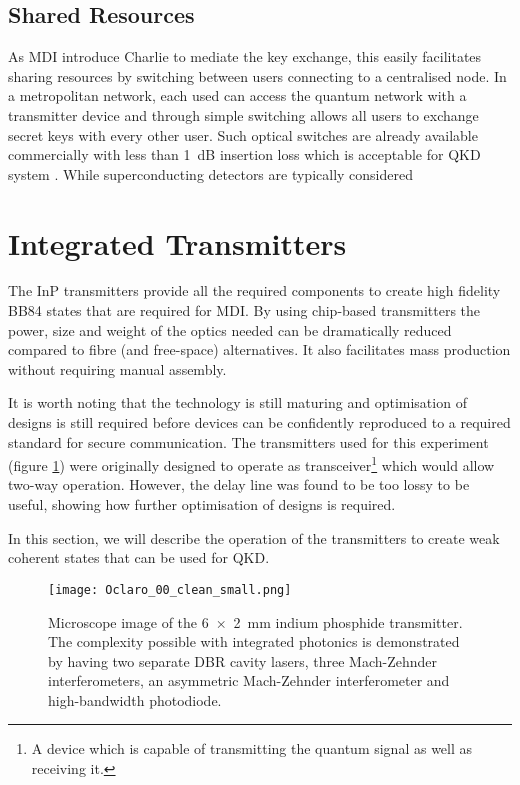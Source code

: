 \subsection{Shared Resources}

As \ac{MDI} introduce Charlie to mediate the key exchange, this easily facilitates sharing resources by switching between users connecting to a centralised node. In a metropolitan network, each used can access the quantum network with a transmitter device and through simple switching allows all users to exchange secret keys with every other user. Such optical switches are already available commercially with less than \SI{1}{dB} insertion loss which is acceptable for \ac{QKD} system \cite{polatis}. While superconducting detectors are typically considered 

\section{Integrated Transmitters}

The \ac{InP} transmitters provide all the required components to create high fidelity BB84 states that are required for \ac{MDI}. By using chip-based transmitters the power, size and weight of the optics needed can be dramatically reduced compared to fibre (and free-space) alternatives. It also facilitates mass production without requiring manual assembly. 

It is worth noting that the technology is still maturing and optimisation of designs is still required before devices can be confidently reproduced to a required standard for secure communication. The transmitters used for this experiment (figure \ref{fig:oclaro_00}) were originally designed to operate as transceiver\footnote{A device which is capable of transmitting the quantum signal as well as receiving it.} which would allow two-way operation. However, the delay line was found to be too lossy to be useful, showing how further optimisation of designs is required.

In this section, we will describe the operation of the transmitters to create weak coherent states that can be used for \acl{QKD}.

\begin{figure}[tbp]
	\centering
	\texttt{[image: Oclaro\_00\_clean\_small.png]}
	\caption[InP transmitter microscope image]{Microscope image of the \SI[product-units=power]{6x2}{mm} indium phosphide transmitter. The complexity possible with integrated photonics is demonstrated by having two separate DBR cavity lasers, three Mach-Zehnder interferometers, an asymmetric  Mach-Zehnder interferometer and high-bandwidth photodiode.}
	\label{fig:oclaro_00}
\end{figure}

